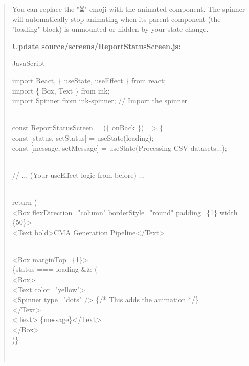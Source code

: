 \documentclass[
]{article}
\begin{document}
\begin{quote}
You can replace the "⏳" emoji with the animated component. The spinner
will automatically stop animating when its parent component (the
"loading" block) is unmounted or hidden by your state change.

\textbf{Update source/screens/ReportStatusScreen.js:}

JavaScript

import React, \{ useState, useEffect \} from
\textquotesingle react\textquotesingle;\\
import \{ Box, Text \} from \textquotesingle ink\textquotesingle;\\
import Spinner from \textquotesingle ink-spinner\textquotesingle; //
Import the spinner\\
\strut \\
const ReportStatusScreen = (\{ onBack \}) =\textgreater{} \{\\
const {[}status, setStatus{]} =
useState(\textquotesingle loading\textquotesingle);\\
const {[}message, setMessage{]} = useState(\textquotesingle Processing
CSV datasets...\textquotesingle);\\
\strut \\
// ... (Your useEffect logic from before) ...\\
\strut \\
return (\\
\textless Box flexDirection="column" borderStyle="round" padding=\{1\}
width=\{50\}\textgreater{}\\
\textless Text bold\textgreater CMA Generation
Pipeline\textless/Text\textgreater{}\\
\strut \\
\textless Box marginTop=\{1\}\textgreater{}\\
\{status === \textquotesingle loading\textquotesingle{} \&\& (\\
\textless Box\textgreater{}\\
\textless Text color="yellow"\textgreater{}\\
\textless Spinner type="dots" /\textgreater{} \{/* This adds the
animation */\}\\
\textless/Text\textgreater{}\\
\textless Text\textgreater{} \{message\}\textless/Text\textgreater{}\\
\textless/Box\textgreater{}\\
)\}\\
\strut \\

\end{quote}
\end{document}
